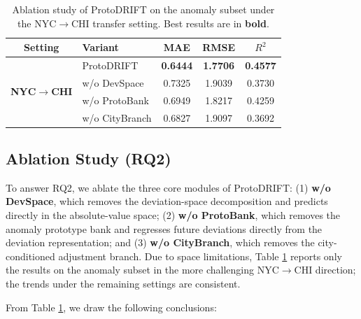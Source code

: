 \begin{table}[htbp]
\centering
\setlength{\tabcolsep}{5pt}
\renewcommand\arraystretch{1.0}
\begin{tabular}{c|l|ccc}
\toprule
\textbf{Setting} & \textbf{Variant} & MAE & RMSE & $R^2$ \\
\midrule
\multirow{4}{*}{\textbf{NYC$\rightarrow$CHI}}
 & ProtoDRIFT     & \textbf{0.6444} & \textbf{1.7706} & \textbf{0.4577} \\
 & w/o DevSpace   & 0.7325 & 1.9039 & 0.3730 \\
 & w/o ProtoBank  & 0.6949 & 1.8217 & 0.4259 \\
 & w/o CityBranch & 0.6827 & 1.9097 & 0.3692 \\
\bottomrule
\end{tabular}
\caption{Ablation study of ProtoDRIFT on the anomaly subset under the NYC$\rightarrow$CHI transfer setting. Best results are in \textbf{bold}.}
\label{tab:ablation}
\end{table}

\subsection{Ablation Study (RQ2)}

To answer RQ2, we ablate the three core modules of ProtoDRIFT: (1) \textbf{w/o DevSpace}, which removes the deviation-space decomposition and predicts directly in the absolute-value space; (2) \textbf{w/o ProtoBank}, which removes the anomaly prototype bank and regresses future deviations directly from the deviation representation; and (3) \textbf{w/o CityBranch}, which removes the city-conditioned adjustment branch. Due to space limitations, Table \ref{tab:ablation} reports only the results on the anomaly subset in the more challenging NYC$\rightarrow$CHI direction; the trends under the remaining settings are consistent.

From Table \ref{tab:ablation}, we draw the following conclusions:

